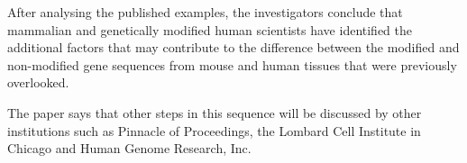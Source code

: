 \documentclass{article}
\begin{document}
After analysing the published examples, the investigators conclude that mammalian and genetically modified human scientists have identified the additional factors that may contribute to the difference between the modified and non-modified gene sequences from mouse and human tissues that were previously overlooked.

The paper says that other steps in this sequence will be discussed by other institutions such as Pinnacle of Proceedings, the Lombard Cell Institute in Chicago and Human Genome Research, Inc.
\end{document}
